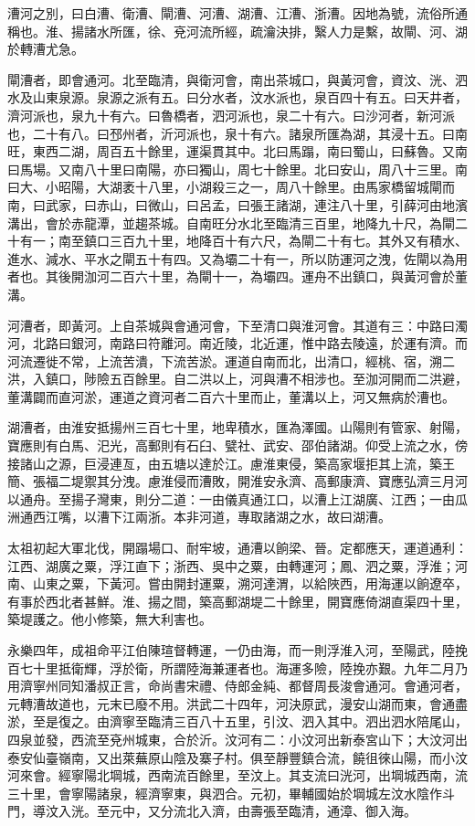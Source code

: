 漕河之別，曰白漕、衛漕、閘漕、河漕、湖漕、江漕、浙漕。因地為號，流俗所通稱也。淮、揚諸水所匯，徐、兗河流所經，疏瀹決排，繄人力是繫，故閘、河、湖於轉漕尤急。

閘漕者，即會通河。北至臨清，與衛河會，南出茶城口，與黃河會，資汶、洸、泗水及山東泉源。泉源之派有五。曰分水者，汶水派也，泉百四十有五。曰天井者，濟河派也，泉九十有六。曰魯橋者，泗河派也，泉二十有六。曰沙河者，新河派也，二十有八。曰邳州者，沂河派也，泉十有六。諸泉所匯為湖，其浸十五。曰南旺，東西二湖，周百五十餘里，運渠貫其中。北曰馬蹋，南曰蜀山，曰蘇魯。又南曰馬場。又南八十里曰南陽，亦曰獨山，周七十餘里。北曰安山，周八十三里。南曰大、小昭陽，大湖袤十八里，小湖殺三之一，周八十餘里。由馬家橋留城閘而南，曰武家，曰赤山，曰微山，曰呂孟，曰張王諸湖，連注八十里，引薛河由地濱溝出，會於赤龍潭，並趨茶城。自南旺分水北至臨清三百里，地降九十尺，為閘二十有一；南至鎮口三百九十里，地降百十有六尺，為閘二十有七。其外又有積水、進水、減水、平水之閘五十有四。又為壩二十有一，所以防運河之洩，佐閘以為用者也。其後開泇河二百六十里，為閘十一，為壩四。運舟不出鎮口，與黃河會於董溝。

河漕者，即黃河。上自茶城與會通河會，下至清口與淮河會。其道有三：中路曰濁河，北路曰銀河，南路曰符離河。南近陵，北近運，惟中路去陵遠，於運有濟。而河流遷徙不常，上流苦潰，下流苦淤。運道自南而北，出清口，經桃、宿，溯二洪，入鎮口，陟險五百餘里。自二洪以上，河與漕不相涉也。至泇河開而二洪避，董溝闢而直河淤，運道之資河者二百六十里而止，董溝以上，河又無病於漕也。

湖漕者，由淮安抵揚州三百七十里，地卑積水，匯為澤國。山陽則有管家、射陽，寶應則有白馬、汜光，高郵則有石臼、甓社、武安、邵伯諸湖。仰受上流之水，傍接諸山之源，巨浸連亙，由五塘以達於江。慮淮東侵，築高家堰拒其上流，築王簡、張福二堤禦其分洩。慮淮侵而漕敗，開淮安永濟、高郵康濟、寶應弘濟三月河以通舟。至揚子灣東，則分二道：一由儀真通江口，以漕上江湖廣、江西；一由瓜洲通西江嘴，以漕下江兩浙。本非河道，專取諸湖之水，故曰湖漕。

太祖初起大軍北伐，開蹋場口、耐牢坡，通漕以餉梁、晉。定都應天，運道通利：江西、湖廣之粟，浮江直下；浙西、吳中之粟，由轉運河；鳳、泗之粟，浮淮；河南、山東之粟，下黃河。嘗由開封運粟，溯河達渭，以給陜西，用海運以餉遼卒，有事於西北者甚鮮。淮、揚之間，築高郵湖堤二十餘里，開寶應倚湖直渠四十里，築堤護之。他小修築，無大利害也。

永樂四年，成祖命平江伯陳瑄督轉運，一仍由海，而一則浮淮入河，至陽武，陸挽百七十里抵衛輝，浮於衛，所謂陸海兼運者也。海運多險，陸挽亦艱。九年二月乃用濟寧州同知潘叔正言，命尚書宋禮、侍郎金純、都督周長浚會通河。會通河者，元轉漕故道也，元末已廢不用。洪武二十四年，河決原武，漫安山湖而東，會通盡淤，至是復之。由濟寧至臨清三百八十五里，引汶、泗入其中。泗出泗水陪尾山，四泉並發，西流至兗州城東，合於沂。汶河有二：小汶河出新泰宮山下；大汶河出泰安仙臺嶺南，又出萊蕪原山陰及寨子村。俱至靜豐鎮合流，饒徂徠山陽，而小汶河來會。經寧陽北堈城，西南流百餘里，至汶上。其支流曰洸河，出堈城西南，流三十里，會寧陽諸泉，經濟寧東，與泗合。元初，畢輔國始於堈城左汶水陰作斗門，導汶入洸。至元中，又分流北入濟，由壽張至臨清，通漳、御入海。

